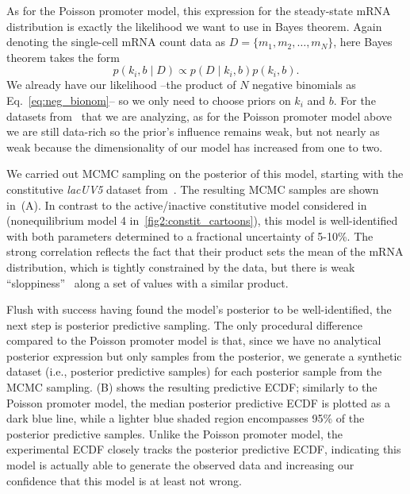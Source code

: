 As for the Poisson promoter model, this expression for the steady-state mRNA
distribution is exactly the likelihood we want to use in Bayes theorem. Again
denoting the single-cell mRNA count data as $D=\{m_1, m_2,\dots, m_N\}$, here
Bayes theorem takes the form
\begin{equation}
p(k_i, b \mid D) \propto p(D\mid k_i,b)p(k_i, b).
\end{equation}
We already have our likelihood --the product of $N$ negative binomials as
Eq.~\ref{eq:neg_bionom}--  so we only need to choose priors on $k_i$ and $b$.
For the datasets from~\cite{Jones2014} that we are analyzing, as for the Poisson
promoter model above we are still data-rich so the prior's influence remains
weak, but not nearly as weak because the dimensionality of our model has
increased from one to two.

We carried out MCMC sampling on the posterior of this model, starting with the
constitutive \textit{lacUV5} dataset from~\cite{Jones2014}. The resulting MCMC
samples are shown in~(A). In contrast to the
active/inactive constitutive model considered in~\cite{Razo-Mejia2020}
(nonequilibrium model 4 in~\ref{fig2:constit_cartoons}), this model is
well-identified with both parameters determined to a fractional uncertainty of
5-10\%. The strong correlation reflects the fact that their product sets the
mean of the mRNA distribution, which is tightly constrained by the data, but
there is weak ``sloppiness''~\cite{Transtrum2015} along a set of values with a
similar product.

Flush with success having found the model's posterior to be well-identified, the
next step is posterior predictive sampling. The only procedural difference
compared to the Poisson promoter model is that, since we have no analytical
posterior expression but only samples from the posterior, we generate a
synthetic dataset (i.e., posterior predictive samples) for each posterior sample
from the MCMC sampling. (B) shows the resulting
predictive ECDF; similarly to the Poisson promoter model, the median posterior
predictive ECDF is plotted as a dark blue line, while a lighter blue shaded
region encompasses 95\% of the posterior predictive samples. Unlike the Poisson
promoter model, the experimental ECDF closely tracks the posterior predictive
ECDF, indicating this model is actually able to generate the observed data and
increasing our confidence that this model is at least not wrong.

